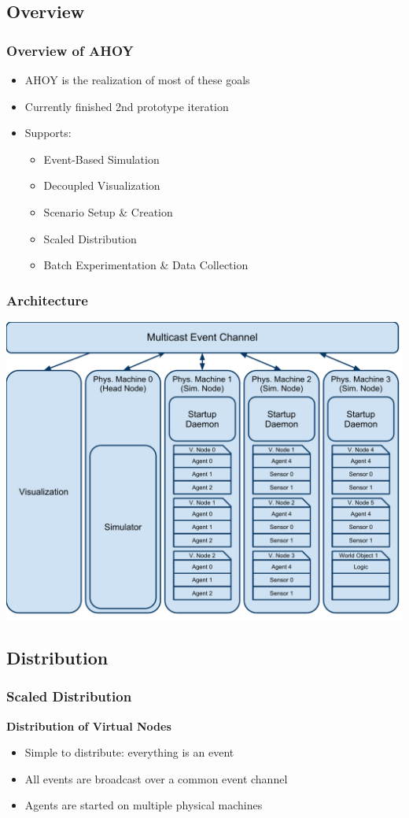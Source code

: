 \documentclass[mathserif]{beamer}
\begin{document}
\subsection{Overview}
\frame
{
    \frametitle{Overview of AHOY}
    \begin{itemize}
        \item AHOY is the realization of most of these goals
        \item Currently finished 2nd prototype iteration
        \item Supports:
        \begin{itemize}
            \item Event-Based Simulation
            \item Decoupled Visualization
            \item Scenario Setup \& Creation
            \item Scaled Distribution
            \item Batch Experimentation \& Data Collection
        \end{itemize}
    \end{itemize}
}

\frame
{
    \frametitle{Architecture}
    \begin{center}
        \includegraphics[scale=.4]{arch.pdf}
    \end{center}
}

\subsection{Distribution}
\frame
{
    \frametitle{Scaled Distribution}
    \textbf{Distribution of Virtual Nodes}
    \begin{itemize}
        \item Simple to distribute: everything is an event
        \item All events are broadcast over a common event channel
        \item Agents are started on multiple physical machines
    \end{itemize}
}
\end{document}
